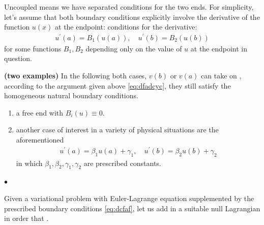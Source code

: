 \documentclass{article}
\newcommand{\bfs}[1]{\textbf{({#1}) }}
\begin{document}
Uncoupled means we have separated conditions for the two ends. For simplicity, let's assume that  both boundary conditions explicitly involve the derivative of the function $u(x)$ at the endpoint: conditions for the derivative:
\begin{align}
u^{\prime}(a)=B_{1}(u(a)), \quad u^{\prime}(b)=B_{2}(u(b))\label{eq:dcfaf}
\end{align}
for some functions $B_{1}, B_{2}$ depending only on the value of $u$ at the endpoint in question.
\begin{rema}\bfs{two examples} In the following both cases,  $v(b)$ or $v(a)$ can take on , according to the argument given above \cref{eq:dfadcyc}, they still satisfy the homogeneous natural boundary conditions.
\begin{enumerate}
    \item a free end with $B_{i}(u) \equiv 0$.
    \item another case of interest in a variety of physical situations are the aforementioned 
\begin{align}
u^{\prime}(a)=\beta_{1} u(a)+\gamma_{1}, \quad u^{\prime}(b)=\beta_{2} u(b)+\gamma_{2}\label{eq:dvdfadfd}
\end{align}
in which $\beta_{1}, \beta_{2}, \gamma_{1}, \gamma_{2}$ are prescribed constants.
\end{enumerate}
\end{rema}

$\bullet$ 

Given a variational problem with Euler-Lagrange equation supplemented by the prescribed boundary conditions \cref{eq:dcfaf}, let us add in a suitable null Lagrangian  in order that .
\end{document}
